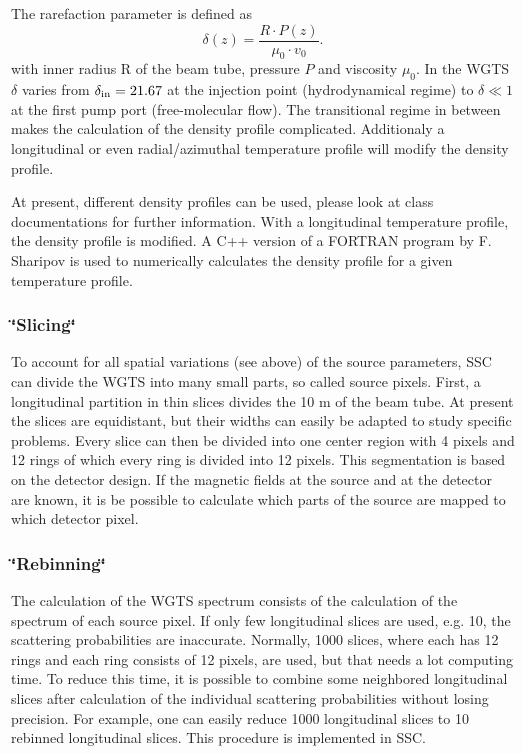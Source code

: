 The rarefaction parameter is defined as \[ \delta(z) = \frac{R \cdot P(z) }{ \mu_0 \cdot v_0}. \label{eq:rarefaction} \] with inner radius R of the beam tube, pressure $P$ and viscosity $\mu_0$. In the WGTS $\delta$ varies from $\delta_{\rm{in}}=21.67$ at the injection point (hydrodynamical regime) to $\delta \ll 1$ at the first pump port (free-\/molecular flow). The transitional regime in between makes the calculation of the density profile complicated. Additionaly a longitudinal or even radial/azimuthal temperature profile will modify the density profile.\par
 At present, different density profiles can be used, please look at class documentations for further information. With a longitudinal temperature profile, the density profile is modified. A C++ version of a FORTRAN program by F. Sharipov is used to numerically calculates the density profile for a given temperature profile.

\subsubsection{\char`\"{}Slicing\char`\"{}}\label{_s_s_cmain_slicing}
To account for all spatial variations (see above) of the source parameters, SSC can divide the WGTS into many small parts, so called source pixels. First, a longitudinal partition in thin slices divides the 10 m of the beam tube. At present the slices are equidistant, but their widths can easily be adapted to study specific problems. Every slice can then be divided into one center region with 4 pixels and 12 rings of which every ring is divided into 12 pixels. This segmentation is based on the detector design. If the magnetic fields at the source and at the detector are known, it is be possible to calculate which parts of the source are mapped to which detector pixel.

\subsubsection{\char`\"{}Rebinning\char`\"{}}\label{_s_s_cmain_rebinning}
The calculation of the WGTS spectrum consists of the calculation of the spectrum of each source pixel. If only few longitudinal slices are used, e.g. 10, the scattering probabilities are inaccurate. Normally, 1000 slices, where each has 12 rings and each ring consists of 12 pixels, are used, but that needs a lot computing time. To reduce this time, it is possible to combine some neighbored longitudinal slices after calculation of the individual scattering probabilities without losing precision. For example, one can easily reduce 1000 longitudinal slices to 10 rebinned longitudinal slices. This procedure is implemented in SSC.

